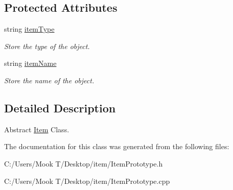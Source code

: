 \subsection*{Protected Attributes}
\begin{DoxyCompactItemize}
\item 
\hypertarget{class_item_a1b0c64bfa9407d49b5ad91d6a7372a38}{}string \hyperlink{class_item_a1b0c64bfa9407d49b5ad91d6a7372a38}{item\+Type}\label{class_item_a1b0c64bfa9407d49b5ad91d6a7372a38}

\begin{DoxyCompactList}\small\item\em Store the type of the object. \end{DoxyCompactList}\item 
\hypertarget{class_item_af7a09a8db2072c632d84a992e76408b9}{}string \hyperlink{class_item_af7a09a8db2072c632d84a992e76408b9}{item\+Name}\label{class_item_af7a09a8db2072c632d84a992e76408b9}

\begin{DoxyCompactList}\small\item\em Store the name of the object. \end{DoxyCompactList}\end{DoxyCompactItemize}


\subsection{Detailed Description}
Abstract \hyperlink{class_item}{Item} Class. 

The documentation for this class was generated from the following files\+:\begin{DoxyCompactItemize}
\item 
C\+:/\+Users/\+Mook T/\+Desktop/item/Item\+Prototype.\+h\item 
C\+:/\+Users/\+Mook T/\+Desktop/item/Item\+Prototype.\+cpp\end{DoxyCompactItemize}
